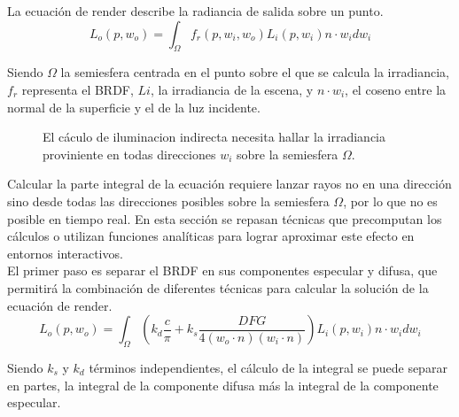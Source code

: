 
    La ecuaci\'on de render describe la radiancia de salida sobre un punto.
    \begin{equation}
    L_o(p, w_o) = \int_{\Omega} f_r(p, w_i, w_o)L_i(p, w_i)n\cdot{w_i}dw_i
    \end{equation}
    \singlespacing
    
    Siendo $\Omega$ la semiesfera centrada en el punto sobre el que se calcula la irradiancia, $f_r$ representa el BRDF, $Li$,
    la irradiancia de la escena, y $n\cdot{w_i}$, el coseno entre la normal de la superficie y el de la luz incidente.
    
    \begin{figure}[H]
        \vspace{0.5cm}
        \centering
        \caption{El c\'aculo de iluminacion indirecta necesita hallar la irradiancia proviniente en todas direcciones $w_i$ sobre la semiesfera $\Omega$.}
      \end{figure}
      \singlespacing

    Calcular la parte integral de la ecuaci\'on requiere lanzar rayos no en una direcci\'on sino desde todas las direcciones posibles
    sobre la semiesfera $\Omega$, por lo que no es posible en tiempo real. En esta secci\'on se repasan t\'ecnicas que precomputan
    los c\'alculos o utilizan funciones anal\'iticas para lograr aproximar este efecto en entornos interactivos.\\

    El primer paso es separar el BRDF en sus componentes especular y difusa, que permitir\'a la combinaci\'on de diferentes
    t\'ecnicas para calcular la soluci\'on de la ecuaci\'on de render.\\

    \begin{equation}
    L_o(p, w_o) = \int_{\Omega} (k_d \frac{c}{\pi} + 
    k_s \frac{DFG}{4(w_o\cdot{n})(w_i\cdot{n})})L_i(p, w_i)n\cdot{w_i}dw_i
    \end{equation}
    \singlespacing
    
    Siendo $k_s$ y $k_d$ t\'erminos independientes, el c\'alculo de la integral se puede separar en partes, la
    integral de la componente difusa m\'as la integral de la componente especular. 
    
